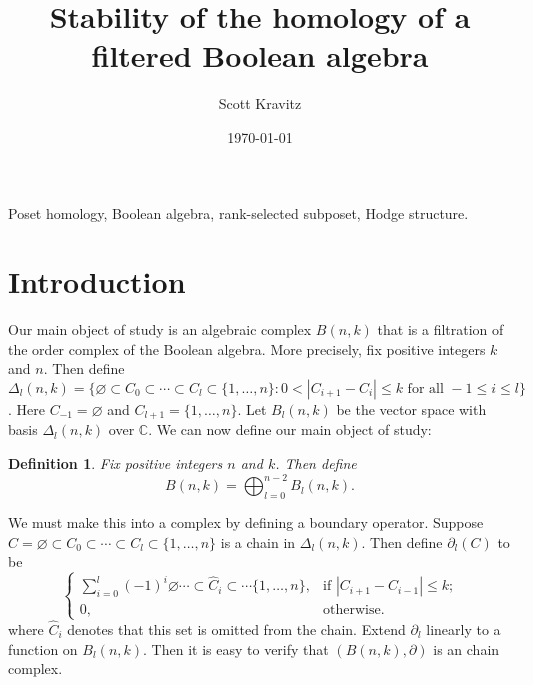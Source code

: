 \documentclass{elsart}
\newtheorem{definition}[theorem]{Definition}
\newcommand{\C}{\mathbb{C}}
\newcommand{\full}{\{1, \ldots, n\}}
\begin{document}
\begin{frontmatter}
\title{Stability of the homology of a filtered Boolean algebra}

\author{Scott Kravitz}
\address{skravitz@umich.edu, Department of Mathematics, University of Michigan, Ann Arbor, MI 48109-1003} 
\begin{keyword}
Poset homology, Boolean algebra, rank-selected subposet, Hodge structure.
\end{keyword}

\date{\today}     


\end{frontmatter}

\section{Introduction}\label{S:intro}

  Our main object of study is an algebraic complex $B(n, k)$ that is a filtration of the order complex of the 
Boolean algebra. More precisely, fix positive integers $k$ and $n$. Then define 
  $\Delta_l(n, k) = \{\varnothing \subset C_0 \subset \cdots \subset C_l \subset \{1, \ldots, n\}
  \colon 0 < |C_{i+1} - C_i| \le k 
  \mbox{ for all } -1 \le i \le l \}$. Here $C_{-1} = \varnothing$ and $C_{l+1} = \full$. Let $B_l(n, k)$ be the vector 
   space with basis $\Delta_l(n, k)$ over $\C$.
  We can now define our main object of study: 
\begin{definition}\label{:B(n,k)} Fix positive integers $n$ and $k$. Then define
  \begin{equation}
    B(n, k) = \bigoplus_{l=0}^{n-2} B_l(n, k).
  \end{equation}
\end{definition}
We must make this into a complex by defining a boundary operator. Suppose $C = \varnothing \subset C_0 \subset  \cdots
\subset C_l \subset \{1, \ldots, n\}$ is a chain in $\Delta_l(n, k)$.
Then define $\partial_l(C)$ to be 
\begin{equation}\label{E:delta}
  \begin{cases}
     \sum_{i=0}^l (-1)^i \varnothing \cdots \subset {\hat C_i} \subset \cdots \full, 
         &\text{if $|C_{i+1} - C_{i-1}| \le k$;}\\
     0, &\text{otherwise.}
  \end{cases}
\end{equation} where ${\hat C_i}$ denotes that this set is omitted from the chain. 
Extend $\partial_l$ linearly to a function on $B_l(n, k)$. Then it is easy to verify that $(B(n, k), \partial)$
is an chain complex.  
\end{document}
